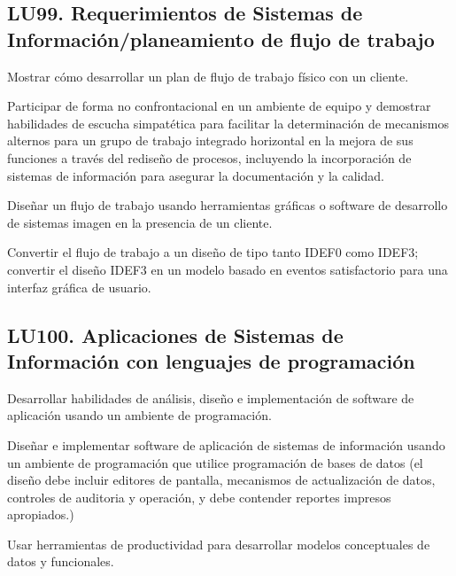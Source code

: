 \subsection{LU99. Requerimientos de Sistemas de Información/planeamiento de flujo de trabajo}\label{sec:BOK-LU99}\label{sec:LU99}
\begin{LearningUnit}
\begin{LUGoal}
\item Mostrar cómo desarrollar un plan de flujo de trabajo físico con un cliente.
\end{LUGoal}

\begin{LUObjective}
\item Participar de forma no confrontacional en un ambiente de equipo y demostrar habilidades de escucha simpatética para facilitar la determinación de mecanismos alternos para un grupo de trabajo integrado horizontal en la mejora de sus funciones a través del rediseño de procesos, incluyendo la incorporación de sistemas de información para asegurar la documentación y la calidad.
\item Diseñar un flujo de trabajo usando herramientas gráficas o software de desarrollo de sistemas imagen en la presencia de un cliente.
\item Convertir el flujo de trabajo a un diseño de tipo tanto IDEF0 como IDEF3; convertir el diseño IDEF3 en un modelo basado en eventos satisfactorio para una interfaz gráfica de usuario.
\end{LUObjective}
\end{LearningUnit}

\subsection{LU100. Aplicaciones de Sistemas de Información con lenguajes de programación}\label{sec:BOK-LU100}\label{sec:LU100}
\begin{LearningUnit}
\begin{LUGoal}
\item Desarrollar habilidades de análisis, diseño e implementación de software de aplicación usando un ambiente de programación.
\end{LUGoal}

\begin{LUObjective}
\item Diseñar e implementar software de aplicación de sistemas de información usando un ambiente de programación que utilice programación de bases de datos (el diseño debe incluir editores de pantalla, mecanismos de actualización de datos, controles de auditoria y operación, y debe contender reportes impresos apropiados.)
\item Usar herramientas de productividad para desarrollar modelos conceptuales de datos y funcionales.
\end{LUObjective}
\end{LearningUnit}

